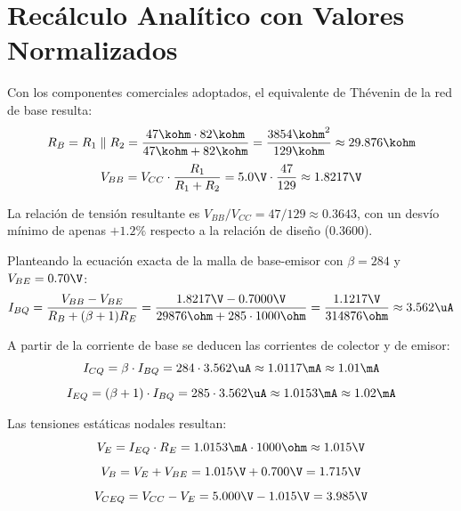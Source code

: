 \section{Recálculo Analítico con Valores Normalizados}

Con los componentes comerciales adoptados, el equivalente de Thévenin de la red de base resulta:
\begin{equation}
  R_B = R_1 \parallel R_2 = \frac{47\kohm \cdot 82\kohm}{47\kohm + 82\kohm} = \frac{3854\kohm^2}{129\kohm} \approx 29.876\kohm
  \label{eq:RB_norm}
\end{equation}
\begin{equation}
  V_{BB} = V_{CC} \cdot \frac{R_1}{R_1 + R_2} = 5.0\V \cdot \frac{47}{129} \approx 1.8217\V
  \label{eq:VBB_norm}
\end{equation}

La relación de tensión resultante es $V_{BB}/V_{CC} = 47/129 \approx 0.3643$, con un desvío mínimo de apenas $+1.2\%$
respecto a la relación de diseño ($0.3600$).

Planteando la ecuación exacta de la malla de base-emisor con $\beta = 284$ y $V_{BE} = 0.70\V$:
\begin{equation}
  I_{BQ} = \frac{V_{BB} - V_{BE}}{R_B + (\beta + 1) R_E} = \frac{1.8217\V - 0.7000\V}{29876\ohm + 285 \cdot 1000\ohm} = \frac{1.1217\V}{314876\ohm} \approx 3.562\uA
  \label{eq:IBQ_norm}
\end{equation}

A partir de la corriente de base se deducen las corrientes de colector y de emisor:
\begin{equation}
  I_{CQ} = \beta \cdot I_{BQ} = 284 \cdot 3.562\uA \approx 1.0117\mA \approx 1.01\mA
  \label{eq:ICQ_norm}
\end{equation}
\begin{equation}
  I_{EQ} = (\beta + 1) \cdot I_{BQ} = 285 \cdot 3.562\uA \approx 1.0153\mA \approx 1.02\mA
  \label{eq:IEQ_norm}
\end{equation}

Las tensiones estáticas nodales resultan:
\begin{equation}
  V_E = I_{EQ} \cdot R_E = 1.0153\mA \cdot 1000\ohm \approx 1.015\V
  \label{eq:VE_norm}
\end{equation}
\begin{equation}
  V_B = V_E + V_{BE} = 1.015\V + 0.700\V = 1.715\V
  \label{eq:VB_norm}
\end{equation}
\begin{equation}
  V_{CEQ} = V_{CC} - V_E = 5.000\V - 1.015\V = 3.985\V
  \label{eq:VCEQ_norm}
\end{equation}


